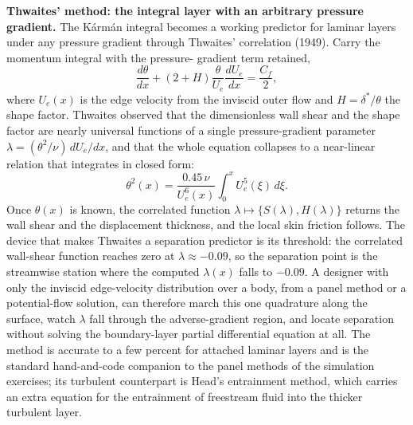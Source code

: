 \begin{mastery}
\textbf{Thwaites' method: the integral layer with an arbitrary
pressure gradient.} The Kármán integral becomes a working predictor
for laminar layers under any pressure gradient through Thwaites'
correlation (1949). Carry the momentum integral with the pressure-
gradient term retained,
\[
\frac{d\theta}{dx} + (2 + H)\frac{\theta}{U_e}\frac{dU_e}{dx} =
\frac{C_f}{2},
\]
where $U_e(x)$ is the edge velocity from the inviscid outer flow and
$H = \delta^*/\theta$ the shape factor. Thwaites observed that the
dimensionless wall shear and the shape factor are nearly universal
functions of a single pressure-gradient parameter $\lambda =
(\theta^2/\nu)\,dU_e/dx$, and that the whole equation collapses to a
near-linear relation that integrates in closed form:
\[
\theta^2(x) = \frac{0.45\,\nu}{U_e^6(x)}\int_0^x U_e^5(\xi)\,d\xi.
\]
Once $\theta(x)$ is known, the correlated function $\lambda
\mapsto\{S(\lambda),H(\lambda)\}$ returns the wall shear and the
displacement thickness, and the local skin friction follows. The
device that makes Thwaites a separation predictor is its threshold:
the correlated wall-shear function reaches zero at $\lambda\approx
-0.09$, so the separation point is the streamwise station where the
computed $\lambda(x)$ falls to $-0.09$. A designer with only the
inviscid edge-velocity distribution over a body, from a panel method
or a potential-flow solution, can therefore march this one quadrature
along the surface, watch $\lambda$ fall through the adverse-gradient
region, and locate separation without solving the boundary-layer
partial differential equation at all. The method is accurate to a few
percent for attached laminar layers and is the standard hand-and-code
companion to the panel methods of the simulation exercises; its
turbulent counterpart is Head's entrainment method, which carries an
extra equation for the entrainment of freestream fluid into the
thicker turbulent layer.
\end{mastery}

